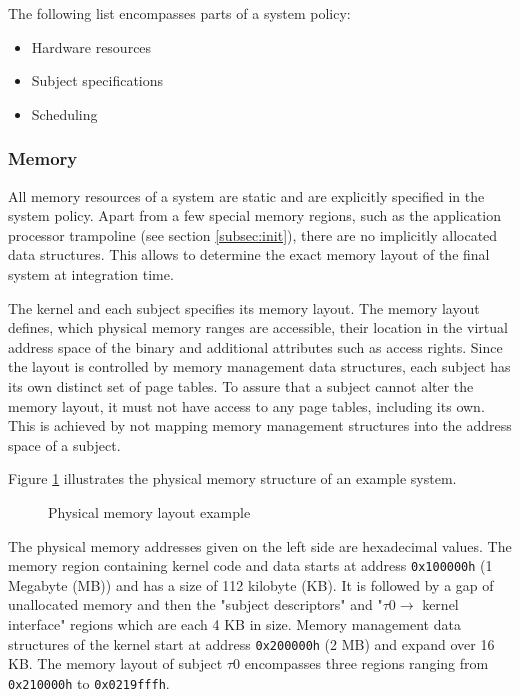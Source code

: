 The following list encompasses parts of a system policy:
\begin{itemize}
	\item Hardware resources
	\item Subject specifications
	\item Scheduling
\end{itemize}

\subsubsection{Memory}
All memory resources of a system are static and are explicitly specified in the
system policy. Apart from a few special memory regions, such as the application
processor trampoline (see section \ref{subsec:init}), there are no implicitly
allocated data structures. This allows to determine the exact memory layout of
the final system at integration time.

The kernel and each subject specifies its memory layout. The memory layout
defines, which physical memory ranges are accessible, their location in the
virtual address space of the binary and additional attributes such as access
rights. Since the layout is controlled by memory management data structures,
each subject has its own distinct set of page tables. To assure that a subject
cannot alter the memory layout, it must not have access to any page tables,
including its own. This is achieved by not mapping memory management structures
into the address space of a subject.

Figure \ref{fig:phys-mem-layout-example} illustrates the physical memory
structure of an example system.

\begin{figure}[h]
	\centering
	
	\caption{Physical memory layout example}
	\label{fig:phys-mem-layout-example}
\end{figure}

The physical memory addresses given on the left side are hexadecimal values.
The memory region containing kernel code and data starts at address
\texttt{0x100000h} (1 Megabyte (MB)) and has a size of 112 kilobyte (KB). It is
followed by a gap of unallocated memory and then the "subject descriptors" and
"$\tau0\rightarrow$ kernel interface" regions which are each 4 KB in size.
Memory management data structures of the kernel start at address
\texttt{0x200000h} (2 MB) and expand over 16 KB. The memory layout of subject
$\tau0$ encompasses three regions ranging from \texttt{0x210000h} to
\texttt{0x0219fffh}.

